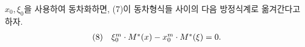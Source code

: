 
$x_0,\xi_0$을 사용하여 동차화하면, (7)이 동차형식들 사이의 다음 방정식계로 옮겨간다고 하자.
\[
\begin{array}{@{}l@{\quad}c@{}}
(8)& \xi_0^m\cdot M^*(x)-x_0^m\cdot M^*(\xi)=0.
\end{array}
\]
